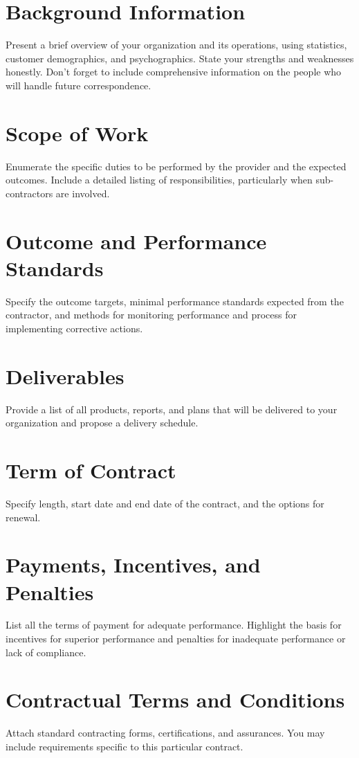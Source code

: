 \documentclass[10pt]{article}
\begin{document}
\section{Background Information}
Present a brief overview of your organization and its operations, using statistics, customer demographics, and psychographics. State your strengths and weaknesses honestly. Don't forget to include comprehensive information on the people who will handle future correspondence.

\section{Scope of Work}
Enumerate the specific duties to be performed by the provider and the expected outcomes. Include a detailed listing of responsibilities, particularly when sub-contractors are involved.

\section{Outcome and Performance Standards}
Specify the outcome targets, minimal performance standards expected from the contractor, and methods for monitoring performance and process for implementing corrective actions.

\section{Deliverables}
Provide a list of all products, reports, and plans that will be delivered to your organization and propose a delivery schedule.

\section{Term of Contract}
Specify length, start date and end date of the contract, and the options for renewal.

\section{Payments, Incentives, and Penalties}
List all the terms of payment for adequate performance. Highlight the basis for incentives for superior performance and penalties for inadequate performance or lack of compliance.

\section{Contractual Terms and Conditions}
Attach standard contracting forms, certifications, and assurances. You may include requirements specific to this particular contract.
\end{document}

